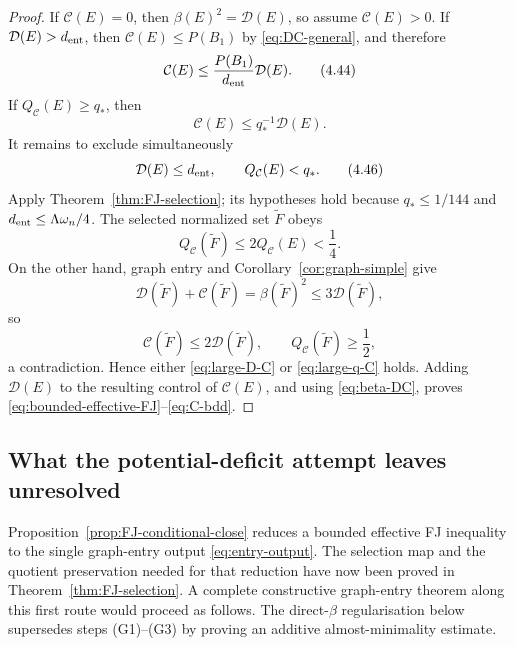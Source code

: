 \documentclass[11pt]{amsart}
\theoremstyle{definition}
\newcommand{\Per}{P}
\newcommand{\Def}{\mathcal D}
\begin{document}
\begin{proof}
If \(\mathcal C(E)=0\), then \(\beta(E)^2=\Def(E)\), so assume
\(\mathcal C(E)>0\).  If \(\Def(E)>d_{\rm ent}\), then
\(\mathcal C(E)\le\Per(B_1)\) by \eqref{eq:DC-general}, and therefore
\[
   \mathcal C(E)
   \le\frac{\Per(B_1)}{d_{\rm ent}}\Def(E).
\tag{4.44}\label{eq:large-D-C}
\]
If \(Q_{\mathcal C}(E)\ge q_*\), then
\[
   \mathcal C(E)\le q_*^{-1}\Def(E).
\tag{4.45}\label{eq:large-q-C}
\]
It remains to exclude simultaneously
\[
   \Def(E)\le d_{\rm ent},\qquad
   Q_{\mathcal C}(E)<q_*.
\tag{4.46}\label{eq:bad-regime}
\]
Apply Theorem~\ref{thm:FJ-selection}; its hypotheses hold because
\(q_*\le1/144\) and \(d_{\rm ent}\le\Lambda\omega_n/4\).  The selected normalized set
\(\widetilde F\) obeys
\[
   Q_{\mathcal C}(\widetilde F)\le2Q_{\mathcal C}(E)<\frac14.
\tag{4.47}\label{eq:q-upper-selected}
\]
On the other hand, graph entry and Corollary~\ref{cor:graph-simple} give
\[
   \Def(\widetilde F)+\mathcal C(\widetilde F)
   =\beta(\widetilde F)^2
   \le3\Def(\widetilde F),
\]
so
\[
   \mathcal C(\widetilde F)\le2\Def(\widetilde F),
   \qquad
   Q_{\mathcal C}(\widetilde F)\ge\frac12,
\tag{4.48}\label{eq:q-lower-selected}
\]
a contradiction.  Hence either \eqref{eq:large-D-C} or
\eqref{eq:large-q-C} holds.  Adding \(\Def(E)\) to the resulting control of
\(\mathcal C(E)\), and using \eqref{eq:beta-DC}, proves
\eqref{eq:bounded-effective-FJ}--\eqref{eq:C-bdd}.
\end{proof}

\subsection{What the potential-deficit attempt leaves unresolved}

Proposition~\ref{prop:FJ-conditional-close} reduces a bounded effective FJ
inequality to the single graph-entry output \eqref{eq:entry-output}.
The selection map and the quotient preservation needed for that reduction
have now been proved in Theorem~\ref{thm:FJ-selection}.  A complete
constructive graph-entry theorem along this first route would proceed as
follows.  The direct-\(\beta\) regularisation below supersedes steps (G1)--(G3)
by proving an additive almost-minimality estimate.
\end{document}
